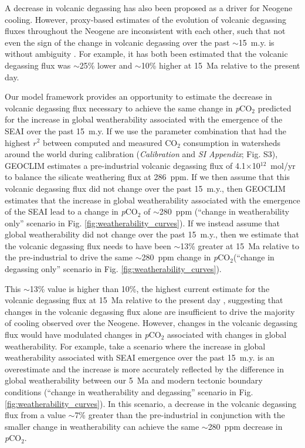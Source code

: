 \documentclass[9pt,twocolumn,twoside,lineno]{pnas-new}
\newcommand{\pCOtwo}{\textit{p}CO$_{2}$\xspace}
\newcommand{\COtwo}{CO$_{2}$\xspace}
\newcommand{\SI}{\textit{SI Appendix}\xspace}
\begin{document}
A decrease in volcanic degassing \cite{Berner1983a} has also been proposed as a driver for Neogene cooling. However, proxy-based estimates of the evolution of volcanic degassing fluxes throughout the Neogene are inconsistent with each other, such that not even the sign of the change in volcanic degassing over the past $\sim$15~m.y. is without ambiguity \cite{Godderis2017c}. For example, it has both been estimated that the volcanic degassing flux was $\sim$25\% lower \cite{Cogne2006a} and $\sim$10\% higher \cite{Van-Der-Meer2014a} at 15~Ma relative to the present day.

Our model framework provides an opportunity to estimate the decrease in volcanic degassing flux necessary to achieve the same change in \pCOtwo predicted for the increase in global weatherability associated with the emergence of the SEAI over the past 15~m.y. If we use the parameter combination that had the highest $r^{2}$ between computed and measured \COtwo consumption in watersheds around the world during calibration (\textit{Calibration} and \SI; Fig. S3), GEOCLIM estimates a pre-industrial volcanic degassing flux of 4.1$\times$10$^{12}$~mol/yr to balance the silicate weathering flux at 286~ppm. If we then assume that this volcanic degassing flux did not change over the past 15~m.y., then GEOCLIM estimates that the increase in global weatherability associated with the emergence of the SEAI lead to a change in \pCOtwo of $\sim$280~ppm (``change in weatherability only'' scenario in Fig. \ref{fig:weatherability_curves}). If we instead assume that global weatherability did not change over the past 15~m.y., then we estimate that the volcanic degassing flux needs to have been $\sim$13\% greater at 15~Ma relative to the pre-industrial to drive the same $\sim$280~ppm change in \pCOtwo (``change in degassing only'' scenario in Fig. \ref{fig:weatherability_curves}).

This $\sim$13\% value is higher than 10\%, the highest current estimate for the volcanic degassing flux at 15~Ma relative to the present day \cite{Van-Der-Meer2014a}, suggesting that changes in the volcanic degassing flux alone are insufficient to drive the majority of cooling observed over the Neogene. However, changes in the volcanic degassing flux would have modulated changes in \pCOtwo associated with changes in global weatherability. For example, take a scenario where the increase in global weatherability associated with SEAI emergence over the past 15~m.y. is an overestimate and the increase is more accurately reflected by the difference in global weatherability between our 5~Ma and modern tectonic boundary conditions (``change in weatherability and degassing'' scenario in Fig. \ref{fig:weatherability_curves}). In this scenario, a decrease in the volcanic degassing flux from a value $\sim$7\% greater than the pre-industrial in conjunction with the smaller change in weatherability can achieve the same $\sim$280~ppm decrease in \pCOtwo.
\end{document}
